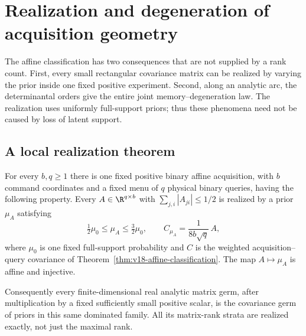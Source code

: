 \section{Realization and degeneration of acquisition geometry}
\label{sec:v19-degeneration}
The affine classification has two consequences that are not supplied
by a rank count. First, every small rectangular covariance matrix can
be realized by varying the prior inside one fixed positive experiment.
Second, along an analytic arc, the determinantal orders give the entire
joint memory--degeneration law. The realization uses uniformly
full-support priors; thus these phenomena need not be caused by loss
of latent support.

\subsection{A local realization theorem}
\begin{theorem}
\label{thm:v19-covariance-realization}
For every $b,q\ge1$ there is one fixed positive binary affine
acquisition, with $b$ command coordinates and a fixed menu of $q$
physical binary queries, having the following property. Every
$A\in\R^{q\times b}$ with $\sum_{j,i}|A_{ji}|\le1/2$ is realized
by a prior $\mu_A$ satisfying
\begin{equation}\label{eq:v19-density-envelope}
 \tfrac12\mu_0\le\mu_A\le\tfrac32\mu_0,
 \qquad C_{\mu_A}=\frac{1}{8b\sqrt q}\,A,
\end{equation}
where $\mu_0$ is one fixed full-support probability and $C$ is the
weighted acquisition--query covariance of
Theorem~\ref{thm:v18-affine-classification}.
The map $A\mapsto\mu_A$ is affine and injective.

Consequently every finite-dimensional real analytic matrix germ, after
multiplication by a fixed sufficiently small positive scalar, is the
covariance germ of priors in this same dominated family. All its
matrix-rank strata are realized exactly, not just the maximal rank.
\end{theorem}
